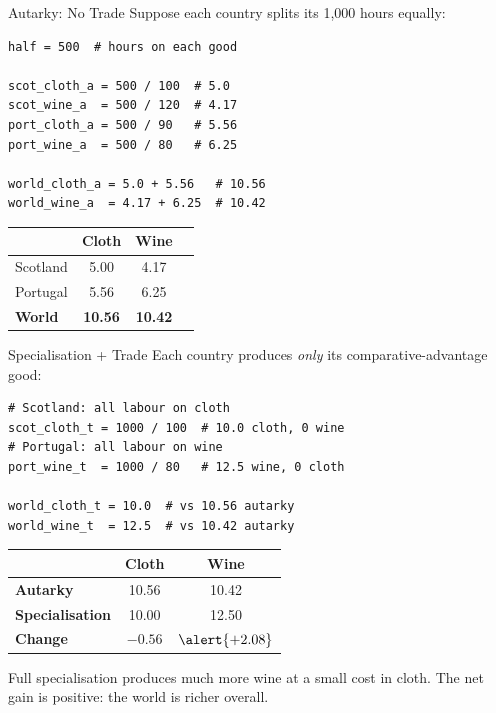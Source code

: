 \documentclass[aspectratio=169, 10pt]{beamer}
\begin{document}
\begin{frame}[fragile]{Autarky: No Trade}
Suppose each country splits its 1,000 hours equally:
\begin{lstlisting}
half = 500  # hours on each good

scot_cloth_a = 500 / 100  # 5.0
scot_wine_a  = 500 / 120  # 4.17
port_cloth_a = 500 / 90   # 5.56
port_wine_a  = 500 / 80   # 6.25

world_cloth_a = 5.0 + 5.56   # 10.56
world_wine_a  = 4.17 + 6.25  # 10.42
\end{lstlisting}
\vspace{0.3em}
\begin{center}
\begin{tabular}{lccc}
\toprule
 & Cloth & Wine & \\
\midrule
Scotland & 5.00 & 4.17 & \\
Portugal & 5.56 & 6.25 & \\
\midrule
\textbf{World} & \textbf{10.56} & \textbf{10.42} & \\
\bottomrule
\end{tabular}
\end{center}
\end{frame}

\begin{frame}[fragile]{Specialisation + Trade}
Each country produces \textit{only} its comparative-advantage good:
\begin{lstlisting}
# Scotland: all labour on cloth
scot_cloth_t = 1000 / 100  # 10.0 cloth, 0 wine
# Portugal: all labour on wine
port_wine_t  = 1000 / 80   # 12.5 wine, 0 cloth

world_cloth_t = 10.0  # vs 10.56 autarky
world_wine_t  = 12.5  # vs 10.42 autarky
\end{lstlisting}
\vspace{0.3em}
\begin{center}
\begin{tabular}{lcc}
\toprule
 & Cloth & Wine \\
\midrule
\textbf{Autarky} & 10.56 & 10.42 \\
\textbf{Specialisation} & 10.00 & 12.50 \\
\midrule
\textbf{Change} & $-0.56$ & $\alert{+2.08}$ \\
\bottomrule
\end{tabular}
\end{center}
\vspace{0.3em}
Full specialisation produces much more wine at a small cost in cloth.
The \alert{net gain} is positive: the world is richer overall.
\end{frame}
\end{document}
